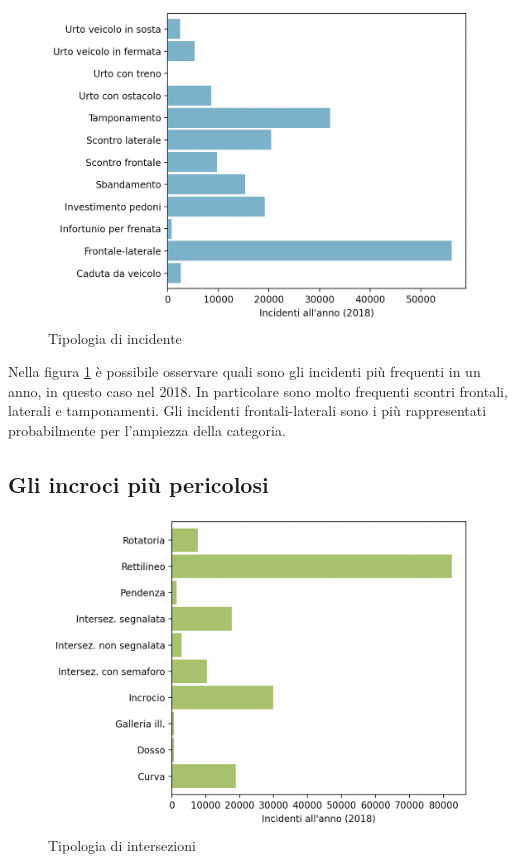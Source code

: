 \documentclass[a4paper]{report}
\begin{document}
\begin{figure}
    \includegraphics[width=\linewidth]{../src/incidenti/incidenti_senza_coords/localizzazione_incidente/tipo_incidente.png}
    \caption{Tipologia di incidente}
    \label{fig:tipo-incidente}
\end{figure}

Nella figura \ref{fig:tipo-incidente} è possibile osservare quali sono gli incidenti più frequenti in un 
anno, in questo caso nel 2018.
In particolare sono molto frequenti scontri frontali, laterali e tamponamenti. 
Gli incidenti frontali-laterali sono i più rappresentati probabilmente per l'ampiezza della 
categoria.

\subsection{Gli incroci più pericolosi}

\begin{figure}
    \includegraphics[width=\linewidth]{../src/incidenti/incidenti_senza_coords/localizzazione_incidente/intersezioni.png}
    \caption{Tipologia di intersezioni}
    \label{fig:tipo-intersezioni}
\end{figure}
\end{document}
